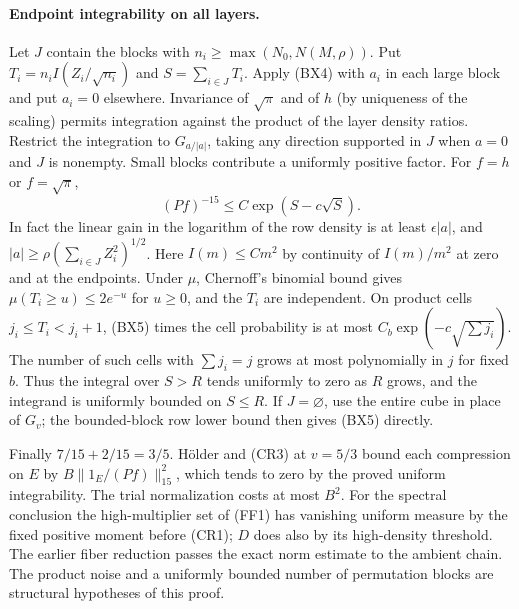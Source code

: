 \paragraph{Endpoint integrability on all layers.}
Let $J$ contain the blocks with $n_i\ge\max(N_0,N(M,\rho))$. Put
$T_i=n_i I(Z_i/\sqrt{n_i})$ and $S=\sum_{i\in J}T_i$. Apply (BX4)
with $a_i$ in each large block and put $a_i=0$ elsewhere. Invariance of
$\sqrt\pi$ and of $h$ (by uniqueness of the scaling) permits integration
against the product of the layer density ratios. Restrict the integration
to $G_{a/|a|}$, taking any direction supported in $J$ when $a=0$ and $J$ is nonempty. Small blocks
contribute a uniformly positive factor. For $f=h$ or $f=\sqrt\pi$,
\[
               (Pf)^{-15}\le C\exp(S-c\sqrt S).                \tag{BX5}
\]
In fact the linear gain in the logarithm of the row density is at least
$\epsilon|a|$, and $|a|\ge\rho(\sum_{i\in J} Z_i^2)^{1/2}$.
Here $I(m)\le C m^2$ by continuity of $I(m)/m^2$ at zero and at the endpoints.
Under $\mu$, Chernoff's binomial bound gives
$\mu(T_i\ge u)\le2e^{-u}$ for $u\ge0$, and the $T_i$ are independent.
On product cells $j_i\le T_i<j_i+1$, (BX5) times the cell probability
is at most $C_b\exp(-c\sqrt{\sum j_i})$. The number of such cells with
$\sum j_i=j$ grows at most polynomially in $j$ for fixed $b$.
Thus the integral over $S>R$ tends uniformly to zero as $R$ grows,
and the integrand is uniformly bounded on $S\le R$. If $J=\varnothing$, use the entire cube in place of $G_v$; the bounded-block row lower bound then gives (BX5) directly.

Finally $7/15+2/15=3/5$. H\"older and (CR3) at $v=5/3$ bound each
compression on $E$ by $B\|1_E/(Pf)\|_{15}^2$, which tends to zero
by the proved uniform integrability. The trial normalization costs at
most $B^2$. For the spectral conclusion the high-multiplier set of (FF1)
has vanishing uniform measure by the fixed positive moment before (CR1);
$D$ does also by its high-density threshold. The earlier fiber reduction
passes the exact norm estimate to the ambient chain.
The product noise and a uniformly bounded number of permutation blocks
are structural hypotheses of this proof.

